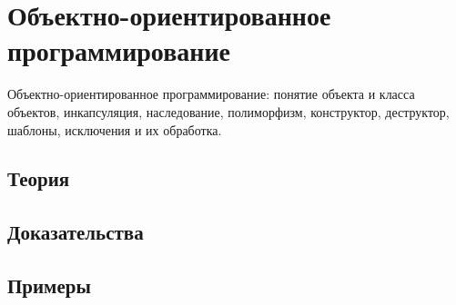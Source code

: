 
\section{Объектно-ориентированное программирование}
\label{sec:1.3.09-oop}

\begin{ticket}
Объектно-ориентированное программирование: понятие объекта и класса объектов, инкапсуляция, наследование, полиморфизм, конструктор, деструктор, шаблоны, исключения и их обработка.
\end{ticket}

\subsection*{Теория}

\subsection*{Доказательства}

\subsection*{Примеры}
